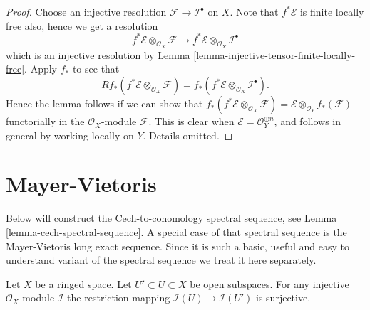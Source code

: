 \begin{proof}
Choose an injective resolution $\mathcal{F} \to \mathcal{I}^\bullet$
on $X$. Note that $f^*\mathcal{E}$ is finite locally free also, hence
we get a resolution
$$
f^*\mathcal{E} \otimes_{\mathcal{O}_X} \mathcal{F}
\longrightarrow
f^*\mathcal{E} \otimes_{\mathcal{O}_X} \mathcal{I}^\bullet
$$
which is an injective resolution by
Lemma \ref{lemma-injective-tensor-finite-locally-free}.
Apply $f_*$ to see that
$$
Rf_*(f^*\mathcal{E} \otimes_{\mathcal{O}_X} \mathcal{F})
=
f_*(f^*\mathcal{E} \otimes_{\mathcal{O}_X} \mathcal{I}^\bullet).
$$
Hence the lemma follows if we can show that
$f_*(f^*\mathcal{E} \otimes_{\mathcal{O}_X} \mathcal{F}) =
\mathcal{E} \otimes_{\mathcal{O}_Y} f_*(\mathcal{F})$ functorially
in the $\mathcal{O}_X$-module $\mathcal{F}$. This is clear when
$\mathcal{E} = \mathcal{O}_Y^{\oplus n}$, and follows in general
by working locally on $Y$. Details omitted.
\end{proof}






\section{Mayer-Vietoris}
\label{section-mayer-vietoris}

\noindent
Below will construct the Cech-to-cohomology spectral sequence, see
Lemma \ref{lemma-cech-spectral-sequence}.
A special case of that spectral sequence is the Mayer-Vietoris
long exact sequence. Since it is such a basic, useful and easy to understand
variant of the spectral sequence we treat it here separately.

\begin{lemma}
\label{lemma-injective-restriction-surjective}
Let $X$ be a ringed space.
Let $U' \subset U \subset X$ be open subspaces.
For any injective $\mathcal{O}_X$-module $\mathcal{I}$ the
restriction mapping
$\mathcal{I}(U) \to \mathcal{I}(U')$ is surjective.
\end{lemma}

